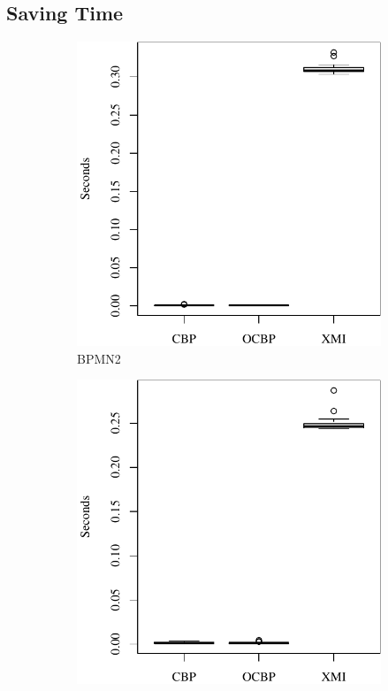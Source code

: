 \documentclass{llncs}
\begin{document}
\subsection{Saving Time}
\label{subsec:saving_time_test}

\begin{figure}[ht]
    \begin{subfigure}{0.325\textwidth}
        \centering
        \includegraphics[width=\linewidth]{images/save_time_bpmn2}
        \caption{BPMN2}
        \label{fig:save_time_bpmn2}
    \end{subfigure}
    \hfill
    \begin{subfigure}{0.325\textwidth}
        \centering
        \includegraphics[width=\linewidth]{images/save_time_epsilon}

\end{subfigure}
\end{figure}
\end{document}
